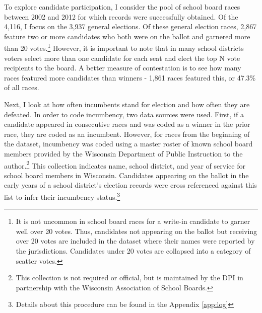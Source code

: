 To explore candidate participation, I consider the pool of school board races between 
2002 and 2012 for which records were successfully obtained. Of the 4,116, I focus on the 3,937 
general elections. Of these general election races, 
2,867 feature 
two or more candidates who both were on the ballot and garnered more than 20 votes.\footnote{
It is not uncommon in school board races for a write-in candidate to garner well over 20 votes. Thus, candidates not appearing on the ballot but receiving over 20 votes are included in the 
dataset where their names were reported by the jurisdictions. Candidates under 20 
votes are collapsed into a category of scatter votes.} 
However, it is important to note that in many school districts voters select more than 
one candidate for each seat and elect the top N vote recipients to the board. A 
better measure of contestation is to see how many races featured more candidates than 
winners - 1,861 
races featured this, or 47.3\% of all races. 

Next, I look at how often incumbents stand for election and how often they are 
defeated. In order to code incumbency, two data sources were used. First, if a 
candidate appeared in consecutive races and was coded as a winner in the prior 
race, they are coded as an incumbent. However, for races from the beginning 
of the dataset, incumbency was coded using a master roster of known school board 
members provided by the Wisconsin Department of Public Instruction to the author.\footnote{
This collection is not required or official, but is maintained by the DPI in partnership with 
the Wisconsin Association of School Boards.} This collection indicates name, school district, 
and year of service for school board members in Wisconsin. Candidates appearing on the ballot 
in the early years of a school district's election records were cross referenced against this 
list to infer their incumbency status.\footnote{Details about this procedure can 
be found in the Appendix \ref{app:log}} 



